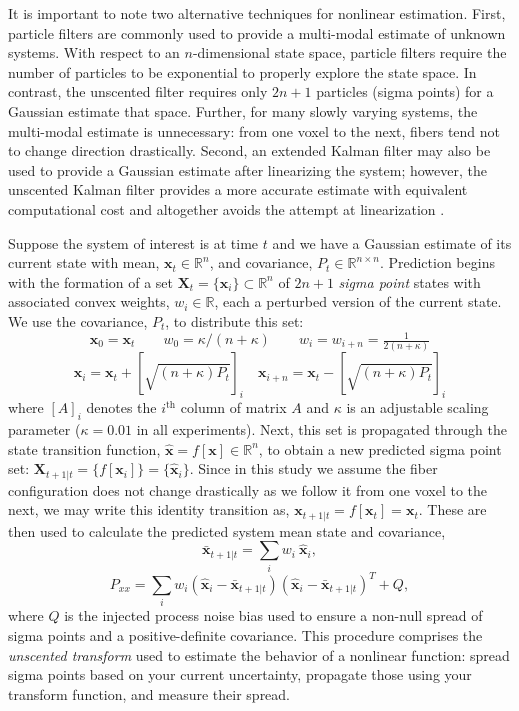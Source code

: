 \documentclass[final,hyperref]{gatech-thesis}
\renewcommand{\v}[1]{\ensuremath{\mathbf #1}\xspace}
\newcommand{\R}{\ensuremath{\mathbb R}}
\newcommand{\x}{\v x}
\newcommand{\X}{\v X}
\begin{document}
It is important to note two alternative techniques for nonlinear estimation.
%
First, particle filters are commonly used to provide a multi-modal estimate of
unknown systems.  With respect to an $n$-dimensional state space, particle
filters require the number of particles to be exponential to properly explore
the state space.  In contrast, the unscented filter requires only $2n+1$
particles (sigma points) for a Gaussian estimate that space.  Further, for
many slowly varying systems, the multi-modal estimate is unnecessary:  from
one voxel to the next, fibers tend not to change direction drastically.
%
Second, an extended Kalman filter may also be used to provide a Gaussian
estimate after linearizing the system; however, the unscented Kalman filter
provides a more accurate estimate with equivalent computational cost and
altogether avoids the attempt at linearization
\cite{Julier2004,Merwe2003,Lefebvre2004}.


Suppose the system of interest is at time $t$ and we have a Gaussian estimate
of its current state with mean, $\x_t \in \R^n$, and covariance, $P_t \in
\R^{n \times n}$.  Prediction begins with the formation of a set
$\X_t=\{\x_i\} \subset \R^n$ of $2n+1$ \textit{sigma point} states with
associated convex weights, $w_i \in \R$, each a perturbed version of the
current state.  We use the covariance, $P_t$, to distribute this set:
\begin{equation*}
  \x_0 = \x_t
  \qquad
  w_0 = \kappa/(n+\kappa)
  \qquad
  w_i = w_{i+n} = \tfrac{1}{2(n+\kappa)}
\end{equation*}
\begin{equation}   \label{eq:sigma_points}
  \x_{i}   = \x_t + \left[\sqrt{(n+\kappa)P_t}\right]_i
  \quad
  \x_{i+n} = \x_t - \left[\sqrt{(n+\kappa)P_t}\right]_i
\end{equation}
where $[A]_i$ denotes the $i^\text{th}$ column of matrix $A$ and $\kappa$ is
an adjustable scaling parameter ($\kappa = 0.01$ in all experiments).  Next,
this set is propagated through the state transition function, $\hat{\x}=f[\x]
\in \R^n$, to obtain a new predicted sigma point set:
$\X_{t+1|t}=\{f[\x_i]\}=\{\hat{\x}_i\}$.  Since in this study we assume the
fiber configuration does not change drastically as we follow it from one voxel
to the next, we may write this identity transition as, $\x_{t+1|t} = f[\x_t] =
\x_t $.  These are then used to calculate the predicted system mean state and
covariance,
\begin{equation*}
  \bar{\x}_{t+1|t} = \sum_i w_i ~ \hat{\x}_i ,
\end{equation*}
\begin{equation} \label{eq:Pxx}
  P_{xx} = \sum_i w_i \left(\hat{\x}_i - \bar{\x}_{t+1|t}\right)
                     \left(\hat{\x}_i - \bar{\x}_{t+1|t}\right)^T
           + Q ,
\end{equation}
where $Q$ is the injected process noise bias used to ensure a non-null spread
of sigma points and a positive-definite covariance.  This procedure comprises
the \textit{unscented transform} used to estimate the behavior of a nonlinear
function: spread sigma points based on your current uncertainty, propagate
those using your transform function, and measure their spread.
\end{document}
